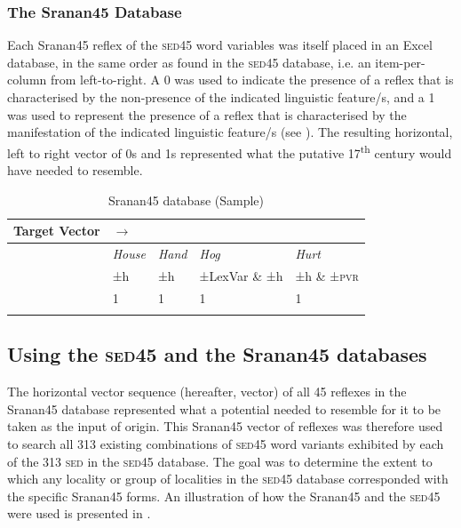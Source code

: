 {{{\subsubsection{The Sranan45 Database}
Each Sranan45 reflex of the \textsc{sed45} word variables was itself placed in an Excel database, in the same order as found in the \textsc{sed45} database, i.e. an item-per-column from left-to-right. A 0 was used to indicate the presence of a reflex that is characterised by the non-presence of the indicated linguistic feature/s, and a 1 was used to represent the presence of a reflex that is characterised by the manifestation of the indicated linguistic feature/s (see ). The resulting horizontal, left to right vector of 0s and 1s represented what the putative 17\textsuperscript{th} century   would have needed to resemble.


\begin{table}
\begin{tabular}{lllll}
\lsptoprule 
Target Vector & \multicolumn{1}{l}{$\longrightarrow$}\\
\midrule 
& \emph{House} & \emph{Hand} & \emph{Hog} & \emph{Hurt} \\
& ±h  & ±h & ±LexVar \& ±h & ±h \& ±\textsc{pvr} \\
& 1 & 1 & 1 & 1 \\
\lspbottomrule 
\end{tabular}
\caption{Sranan45 database (Sample)}
\label{Table 3.10}
\end{table}

\subsection{Using the \textsc{sed45} and the Sranan45 databases}\label{3.4.2}
The horizontal vector sequence (hereafter, vector) of all 45 reflexes in the Sra\-nan45 database represented what a potential   needed to resemble for it to be taken as the input of origin. This Sranan45 vector of reflexes was therefore used to search all 313 existing combinations of \textsc{sed45} word variants exhibited by each of the 313 \textsc{sed}  in the \textsc{sed45} database. The goal was to determine the extent to which any locality or group of localities in the \textsc{sed45} database corresponded with the specific Sranan45 forms. An illustration of how the Sranan45 and the \textsc{sed45} were used is presented in .


}}}
